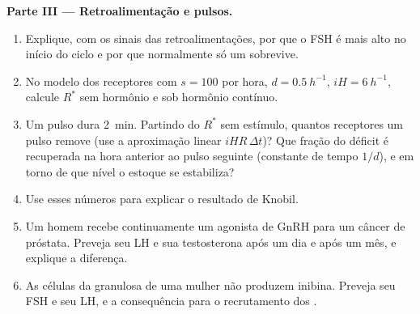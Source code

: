 \begin{problem}
\medskip
\noindent\textbf{Parte III --- Retroalimentação e pulsos.}
\begin{enumerate}[resume]
  \item Explique, com os sinais das retroalimentações, por que o FSH é
        mais alto no início do ciclo e por que normalmente só um
         sobrevive.
  \item No modelo dos receptores com $s = 100$ por hora, $d =
        \qty{0.5}{h^{-1}}$, $iH = \qty{6}{h^{-1}}$, calcule $R^*$ sem
        hormônio e sob hormônio contínuo.
  \item Um pulso dura \qty{2}{min}. Partindo do $R^*$ sem estímulo,
        quantos receptores um pulso remove (use a aproximação linear
        $iHR\,\Delta t$)? Que fração do déficit é recuperada na hora
        anterior ao pulso seguinte (constante de tempo $1/d$), e em
        torno de que nível o estoque se estabiliza?
  \item Use esses números para explicar o resultado de Knobil.
  \item Um homem recebe continuamente um agonista de GnRH para um
        câncer de próstata. Preveja seu LH e sua testosterona após um
        dia e após um mês, e explique a diferença.
  \item As células da granulosa de uma mulher não produzem inibina.
        Preveja seu FSH e seu LH, e a consequência para o recrutamento
        dos .
\end{enumerate}


\end{problem}
